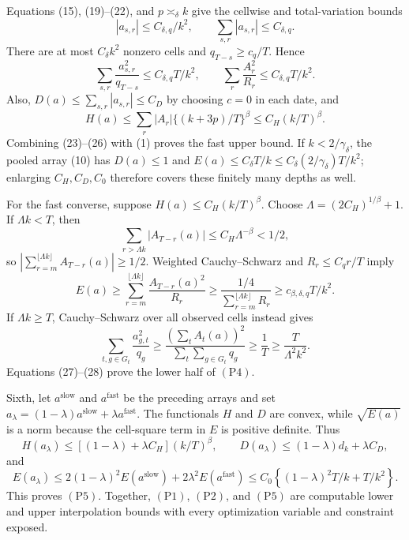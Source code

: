 Equations (15), (19)--(22), and \(p\asymp_\delta k\) give the cellwise and total-variation bounds
\[
 |a_{s,r}|\le C_{\delta,q}/k^2,
 \qquad \sum_{s,r}|a_{s,r}|\le C_{\delta,q}.                   \tag{24}
\]
There are at most \(C_\delta k^2\) nonzero cells and \(q_{T-s}\ge c_q/T\).  Hence
\[
 \sum_{s,r}\frac{a_{s,r}^2}{q_{T-s}}\le C_{\delta,q}T/k^2,
 \qquad
 \sum_r\frac{A_r^2}{R_r}\le C_{\delta,q}T/k^2.                \tag{25}
\]
Also, \(D(a)\le\sum_{s,r}|a_{s,r}|\le C_D\) by choosing \(c=0\) in each date, and
\[
 H(a)\le\sum_r|A_r|\{(k+3p)/T\}^\beta
 \le C_H(k/T)^\beta.                                           \tag{26}
\]
Combining (23)--(26) with (1) proves the fast upper bound.  If \(k<2/\gamma_\delta\), the pooled array (10) has \(D(a)\le1\) and \(E(a)\le C_\delta T/k\le C_\delta(2/\gamma_\delta)T/k^2\); enlarging \(C_H,C_D,C_0\) therefore covers these finitely many depths as well.

For the fast converse, suppose \(H(a)\le C_H(k/T)^\beta\).  Choose \(\Lambda=(2C_H)^{1/\beta}+1\).  If \(\Lambda k<T\), then
\[
 \sum_{r>\Lambda k}|A_{T-r}(a)|\le C_H\Lambda^{-\beta}<1/2,
\]
so \(|\sum_{r=m}^{\lfloor\Lambda k\rfloor}A_{T-r}(a)|\ge1/2\).  Weighted Cauchy--Schwarz and \(R_r\le C_qr/T\) imply
\[
 E(a)\ge
 \sum_{r=m}^{\lfloor\Lambda k\rfloor}
 \frac{A_{T-r}(a)^2}{R_r}
 \ge\frac{1/4}{\sum_{r=m}^{\lfloor\Lambda k\rfloor}R_r}
 \ge c_{\beta,\delta,q}T/k^2.                                  \tag{27}
\]
If \(\Lambda k\ge T\), Cauchy--Schwarz over all observed cells instead gives
\[
 \sum_{t,g\in G_t}\frac{a_{g,t}^2}{q_g}
 \ge\frac{(\sum_tA_t(a))^2}{\sum_t\sum_{g\in G_t}q_g}
 \ge\frac1T\ge\frac{T}{\Lambda^2k^2}.                         \tag{28}
\]
Equations (27)--(28) prove the lower half of \((\mathrm{P4})\).

Sixth, let \(a^{\mathrm{slow}}\) and \(a^{\mathrm{fast}}\) be the preceding arrays and set \(a_\lambda=(1-\lambda)a^{\mathrm{slow}}+\lambda a^{\mathrm{fast}}\).  The functionals \(H\) and \(D\) are convex, while \(\sqrt{E(a)}\) is a norm because the cell-square term in \(E\) is positive definite.  Thus
\[
 H(a_\lambda)\le[(1-\lambda)+\lambda C_H](k/T)^\beta,
 \qquad
 D(a_\lambda)\le(1-\lambda)d_k+\lambda C_D,                   \tag{29}
\]
and
\[
 E(a_\lambda)
 \le2(1-\lambda)^2E(a^{\mathrm{slow}})
    +2\lambda^2E(a^{\mathrm{fast}})
 \le C_0\left\{(1-\lambda)^2T/k+T/k^2\right\}.               \tag{30}
\]
This proves \((\mathrm{P5})\).  Together, \((\mathrm{P1})\), \((\mathrm{P2})\), and \((\mathrm{P5})\) are computable lower and upper interpolation bounds with every optimization variable and constraint exposed.

